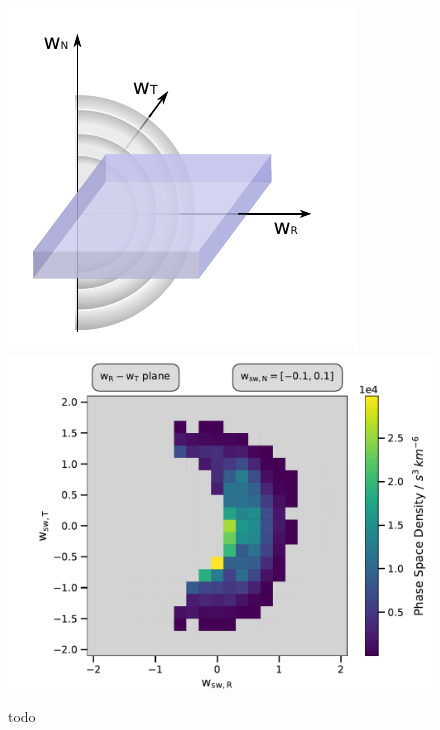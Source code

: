 \begin{figure}[h]
	\includegraphics[width=.4\textwidth]{Figures/slice_N2.pdf}
	\includegraphics[scale=.45]{Figures/slice_psd_N.pdf}
	\centering
	\caption{todo}
	\label{fig:sketch_slice_N}
\end{figure}


%
%
%
\clearpage
